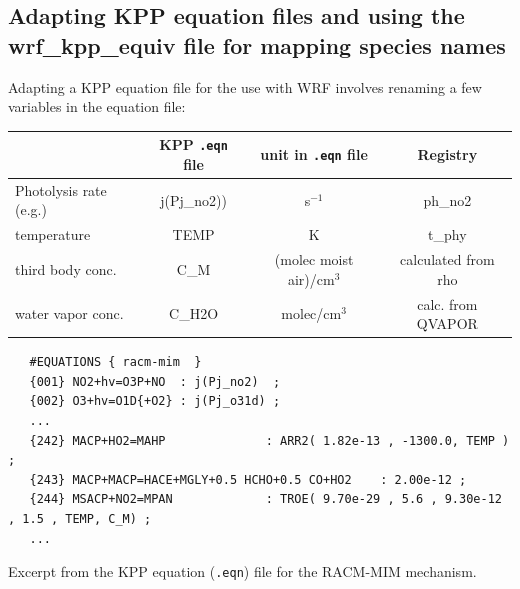 \documentclass[twoside, 12pt, letterpaper]{article}
\newlength{\fminilength}
\newenvironment{fminipage}[1][\linewidth]
 {\setlength{\fminilength}{#1}%
   \begin{lrbox}{\fminibox}\begin{minipage}{\fminilength}}
{\end{minipage}\end{lrbox}\noindent\fbox{\usebox{\fminibox}}}
\begin{document}
\subsection{Adapting KPP equation files and using the wrf\_kpp\_equiv file for mapping species names}
Adapting a KPP equation file for the use with WRF involves renaming a few variables in the equation file: \\ 
\begin{tabular}{|l|c|c|c|}
\hline
                 & KPP {\tt .eqn} file & unit in { \tt .eqn} file & Registry  \\
\hline
Photolysis rate (e.g.) &j(Pj\_no2))        & s$^{-1}$  & ph\_no2    \\
temperature            & TEMP                 &  K & t\_phy \\ 
third body conc. &   C\_M         & (molec moist air)/cm$^3$ & calculated from rho\\
water vapor conc. &  C\_H2O        & molec/cm$^3$ & calc. from  QVAPOR \\  
\hline
\end{tabular}



\begin{File*}[tbp]
\begin{fminipage}
\vspace{5mm}
\begin{verbatim}
   #EQUATIONS { racm-mim  }
   {001} NO2+hv=O3P+NO  : j(Pj_no2)  ;
   {002} O3+hv=O1D{+O2} : j(Pj_o31d) ;
   ...
   {242} MACP+HO2=MAHP				: ARR2( 1.82e-13 , -1300.0, TEMP ) ; 
   {243} MACP+MACP=HACE+MGLY+0.5 HCHO+0.5 CO+HO2 	: 2.00e-12 ;  
   {244} MSACP+NO2=MPAN				: TROE( 9.70e-29 , 5.6 , 9.30e-12 , 1.5 , TEMP, C_M) ;
   ...
\end{verbatim}
\vspace{1mm}
\end{fminipage}
\caption{\label{fi:eqn} Excerpt from the KPP equation ({\tt .eqn}) file for the RACM-MIM \citep{gei03} mechanism.  }
\end{File*}

\vspace{3mm}
\end{document}
